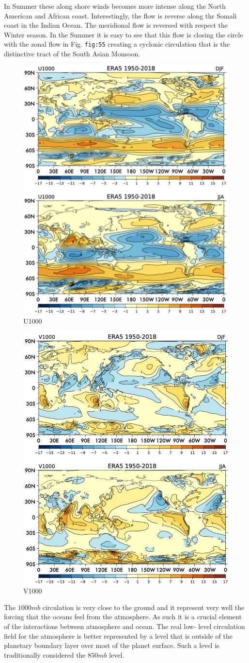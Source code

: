 In Summer these along shore winds becomes more intense along the North
American and African coast. Interestingly, the flow is reverse along thr
Somali coast in the Indian Ocean. The meridional flow is reversed with
respect the Winter season. In the Summer it is easy to see that this
flow is closing the circle with the zonal flow in Fig. \texttt{fig:55}
creating a cyclonic circulation that is the distinctive tract of the
South Asian Monsoon.


\begin{figure}[h!]
    \centering
    \includegraphics[width=0.5\linewidth]{uploads/Screenshot 2024-11-19 132853.png}
    \caption{U1000}
    \label{fig:enter-label}
\end{figure}
\begin{figure}[h!]
    \centering
    \includegraphics[width=0.5\linewidth]{uploads/Screenshot 2024-11-19 132750.png}
    \caption{V1000}
    \label{fig:enter-label}
\end{figure}

The \(1000mb\) circulation is very close to the ground and it represent
very well the forcing that the oceans feel from the atmosphere. As such
it is a crucial element of the interactions between atmosphere and
ocean. The real low- level circulation field for the atmosphere is
better represented by a level that is outside of the planetary boundary
layer over most of the planet surface. Such a level is traditionally
considered the \(850mb\) level.

